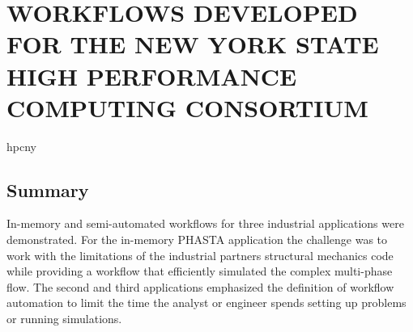 \chapter{WORKFLOWS DEVELOPED FOR THE NEW YORK STATE HIGH PERFORMANCE COMPUTING CONSORTIUM}
\label{chp:hpcnyWorkflows}

{hpcny}

\section{Summary}
In-memory and semi-automated workflows for three industrial applications were
demonstrated.
For the in-memory PHASTA application the challenge was to work with the
limitations of the industrial partners structural mechanics code while providing
a workflow that efficiently simulated the complex multi-phase flow.
The second and third applications emphasized the definition of workflow
automation to limit the time the analyst or engineer spends setting up problems or
running simulations.
